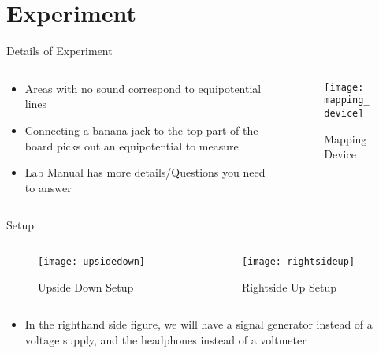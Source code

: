 \documentclass{beamer}
\begin{document}
\section{Experiment}
\begin{frame}{Details of Experiment}
  \begin{columns}
    \begin{column}{0.5\textwidth}
      \begin{itemize}
      \item Areas with no sound correspond to equipotential lines
      \item Connecting a banana jack to the top part of the board picks out an equipotential to measure
      \item Lab Manual has more details/Questions you need to answer
      \end{itemize}
    \end{column}
    \begin{column}{0.5\textwidth}
      \begin{figure}[H]
        \centering
        \texttt{[image: mapping\_device]}
        \caption{Mapping Device}
      \end{figure}
    \end{column}
  \end{columns}
\end{frame}

\begin{frame}{Setup}
  \begin{columns}
    \begin{column}{0.5\textwidth}
      \begin{figure}[H]
        \centering
        \texttt{[image: upsidedown]}
        \caption{Upside Down Setup}
      \end{figure}
    \end{column}
    \begin{column}{0.5\textwidth}
      \begin{figure}[H]
        \centering
        \texttt{[image: rightsideup]}
        \caption{Rightside Up Setup}
      \end{figure}
    \end{column}
  \end{columns}
  \begin{itemize}
  \item In the righthand side figure, we will have a signal generator instead of a voltage supply, and the headphones instead of a voltmeter
  \end{itemize}
\end{frame}
\end{document}

